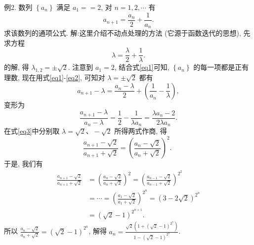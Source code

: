 例2. 数列 $\left\{a_n\right\}$ 满足 $a_1==2$, 对 $n=1,2, \cdots$ 有
$$
a_{n+1}=\frac{a_n}{2}+\frac{1}{a_n} . \label{eq1}
$$
求该数列的通项公式.
解:这里介绍不动点处理的方法 (它源于函数迭代的思想), 先求方程
$$
\lambda=\frac{\lambda}{2}+\frac{1}{\lambda} . \label{eq2}
$$
的解, 得 $\lambda_{1,2}= \pm \sqrt{2}$.
注意到 $a_1=2$, 结合式\ref{eq1}可知, $\left\{a_n\right\}$ 的每一项都是正有理数, 现在用式\ref{eq1}-\ref{eq2}, 可知对 $\lambda= \pm \sqrt{2}$ 都有
$$
a_{n+1}-\lambda=\frac{a_n-\lambda}{2}+\left(\frac{1}{a_n}-\frac{1}{\lambda}\right),
$$
变形为
$$
\frac{a_{n+1}-\lambda}{a_n-\lambda}=\frac{1}{2}-\frac{1}{\lambda a_n}=\frac{\lambda a_n-2}{2 \lambda a_n} . \label{eq3}
$$
在式\ref{eq3}中分别取 $\lambda=\sqrt{2} 、-\sqrt{2}$ 所得两式作商, 得
$$
\frac{a_{n+1}-\sqrt{2}}{a_{n+1}+\sqrt{2}}=\left(\frac{a_n-\sqrt{2}}{a_n+\sqrt{2}}\right)^2 \text {. }
$$
于是, 我们有
$$
\begin{aligned}
\frac{a_{n+1}-\sqrt{2}}{a_{n+1}+\sqrt{2}} & =\left(\frac{a_n-\sqrt{2}}{a_n+\sqrt{2}}\right)^2=\left(\frac{a_{n-1}-\sqrt{2}}{a_{n-1}+\sqrt{2}}\right)^{2^2} \\
& =\cdots=\left(\frac{a_1-\sqrt{2}}{a_1+\sqrt{2}}\right)^{2^n}=(3-2 \sqrt{2})^{2^n} \\
& =(\sqrt{2}-1)^{2^{n+1}} .
\end{aligned}
$$
所以 $\frac{a_n-\sqrt{2}}{a_n+\sqrt{2}}=(\sqrt{2}-1)^{2^n}$, 解得 $a_n=\frac{\sqrt{2}\left(1+(\sqrt{2}-1)^{2^n}\right)}{1-(\sqrt{2}-1)^{2^n}}$.



